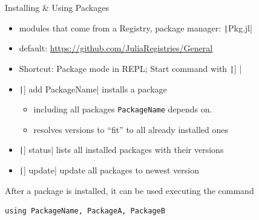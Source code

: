 \documentclass[aspectratio=169, 11pt, handout]{beamer}
\begin{document}
    \begin{frame}[fragile]{Installing \& Using Packages}
        \begin{itemize}
            \item modules that come from a \alert{Registry}, package manager: \texttt|Pkg.jl|
            \pause
            \item default: \url{https://github.com/JuliaRegistries/General}
            \pause
            \item Shortcut: \alert{Package mode} in REPL; Start command with \texttt|] |
            \pause
            \item \texttt|] add PackageName| installs a package
            \begin{itemize}
                \item including all packages \texttt{PackageName} \alert{depends} on.
                \pause
                \item resolves versions to “fit” to all already installed ones
            \end{itemize}
            \pause
            \item \texttt|] status| lists all installed packages with their versions
            \pause
            \item \texttt|] update| update all packages to newest version
        \end{itemize}
        \pause
        After a package is installed, it can be used executing the command
        \begin{verbatim}
using PackageName, PackageA, PackageB
        \end{verbatim}
    \end{frame}
\end{document}
